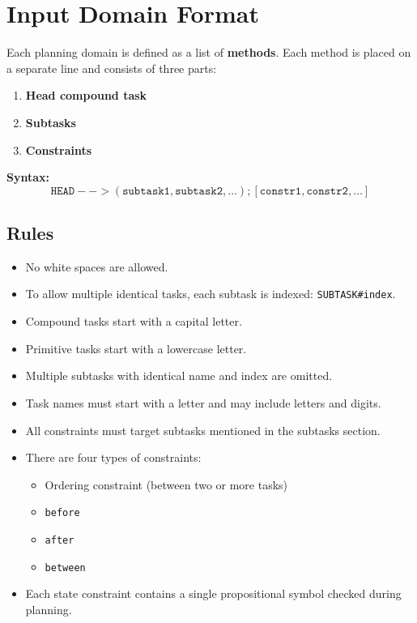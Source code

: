 \documentclass[12pt,a4paper]{report}
\begin{document}
\section{Input Domain Format}

Each planning domain is defined as a list of \textbf{methods}. Each method is placed on a separate line and consists of three parts:

\begin{enumerate}
  \item \textbf{Head compound task}
  \item \textbf{Subtasks}
  \item \textbf{Constraints}
\end{enumerate}

\textbf{Syntax:}
\begin{equation*}
\texttt{HEAD}-->(\texttt{subtask1}, \texttt{subtask2}, \ldots);[\texttt{constr1}, \texttt{constr2}, \ldots]
\end{equation*}

\subsection*{Rules}

\begin{itemize}
  \item No white spaces are allowed.
  \item To allow multiple identical tasks, each subtask is indexed: \texttt{SUBTASK\#index}.
  \item Compound tasks start with a capital letter.
  \item Primitive tasks start with a lowercase letter.
  \item Multiple subtasks with identical name and index are omitted.
  \item Task names must start with a letter and may include letters and digits.
  \item All constraints must target subtasks mentioned in the subtasks section.
  \item There are four types of constraints:
    \begin{itemize}
      \item Ordering constraint (between two or more tasks)
      \item \texttt{before}
      \item \texttt{after}
      \item \texttt{between}
    \end{itemize}
  \item Each state constraint contains a single propositional symbol checked during planning.
\end{itemize}
\end{document}
